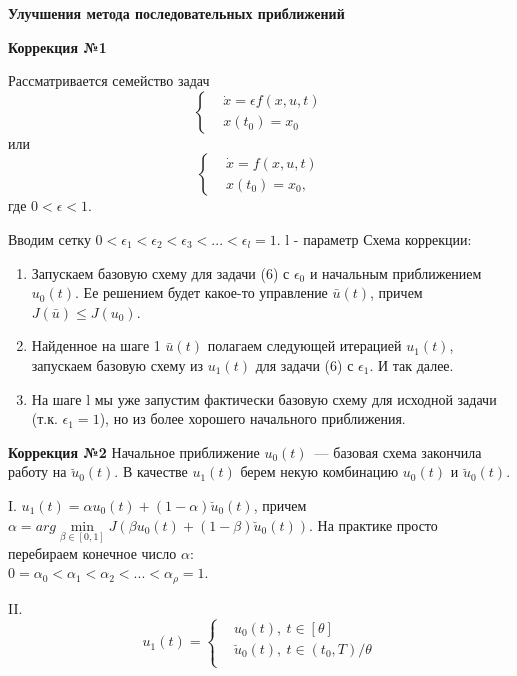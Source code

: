 \documentclass[oneside,final,12pt]{extreport}
\begin{document}
\noindent \textbf{Улучшения метода последовательных приближений}

\noindent \textbf{Коррекция №1}

Рассматривается семейство задач
\begin{equation}
\left \{
\begin{aligned}
& \dot{x} = \epsilon f(x,u,t)\\
& x(t_0)=x_0
\end{aligned} \right.
\end{equation}
или
\begin{equation}
\left \{
\begin{aligned}
& \dot{x} = f(x,u,t)\\
& x(t_0)=x_0, 
\end{aligned} \right.
\end{equation}
где $0< \epsilon <1$.

Вводим сетку $0< \epsilon_1 < \epsilon_2 < \epsilon_3 <...<\epsilon_l=1$. l - параметр
Схема коррекции:
\begin{enumerate}
\item Запускаем базовую схему для задачи (6) с $\epsilon_0$ и начальным приближением $u_0(t)$. Ее решением будет какое-то управление $\bar{u}(t)$, причем $J(\bar{u}) \leqslant J(u_0)$.
\item Найденное на шаге 1 $\bar{u}(t)$ полагаем следующей итерацией $u_1(t)$, запускаем базовую схему из $u_1(t)$ для задачи (6) с $\epsilon_1$. И так далее.
\item На шаге l мы уже запустим фактически базовую схему для исходной задачи (т.к. $\epsilon_1=1$), но из более хорошего начального приближения.
\end{enumerate}

\noindent \textbf{Коррекция №2}
Начальное приближение $u_0(t)$~--- базовая схема закончила работу на $\breve u_0(t)$. В качестве $u_1(t)$ берем некую комбинацию $u_0(t)$ и $\breve u_0(t).$

I.
$u_1(t)=\alpha u_0(t)+(1-\alpha)\breve u_0(t)$, причем $\alpha=arg \min \limits_{\beta \in [0,1]} J(\beta u_0(t)+(1-\beta)\breve u_0(t))$. На практике просто перебираем конечное число $\alpha:$\\ $0=\alpha_0<\alpha_1<\alpha_2<...<\alpha_{\rho}=1$.

II.
$$
 u_1(t)=
\left \{\begin{aligned}
& u_0(t), \  t \in[\theta]\\
& \breve u_0(t), \  t \in(t_0, T)/\theta \\
\end{aligned} \right.
$$
 
\end{document}
